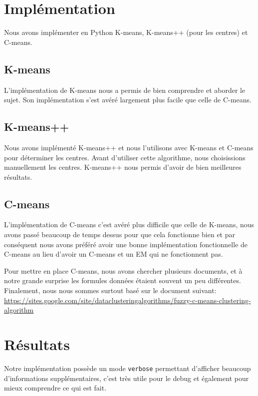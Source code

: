 \documentclass{article}
\begin{document}
  \section{Implémentation}

  Nous avons implémenter en Python K-means, K-means++ (pour les centres) et C-means.

  \subsection{K-means}

  L'implémentation de K-means nous a permis de bien comprendre et aborder le sujet.
  Son implémentation s'est avéré largement plus facile que celle de C-means.

  \subsection{K-means++}

  Nous avons implémenté K-means++ et nous l'utilisons avec K-means et C-means pour déterminer les centres.
  Avant d'utiliser cette algorithme, nous choisissions manuellement les centres.
  K-means++ nous permis d'avoir de bien meilleures résultats.


  \subsection{C-means}

  L'implémentation de C-means c'est avéré plus difficile que celle de K-means,
  nous avons passé beaucoup de temps dessus pour que cela fonctionne bien et
  par conséquent nous avons préféré avoir une bonne implémentation fonctionnelle
  de C-means au lieu d'avoir un C-means et un EM qui ne fonctionnent pas.

  Pour mettre en place C-means, nous avons chercher plusieurs documents, et
  à notre grande surprise les formules données étaient souvent un peu différentes.
  Finalement, nous nous sommes surtout basé sur le document suivant:\\
  \url{https://sites.google.com/site/dataclusteringalgorithms/fuzzy-c-means-clustering-algorithm}


  \section{Résultats}

  Notre implémentation possède un mode \texttt{verbose} permettant d'afficher beaucoup
  d'informations supplémentaires, c'est très utile pour le debug et également pour mieux comprendre ce qui est fait.
\end{document}
